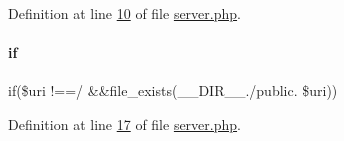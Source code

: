 Definition at line \mbox{\hyperlink{a00005_source_l00010}{10}} of file \mbox{\hyperlink{a00005_source}{server.\+php}}.

\mbox{\label{a00005_afc8b25b448fd1a3d79f6171af75f39ff_afc8b25b448fd1a3d79f6171af75f39ff}} 
\paragraph{\texorpdfstring{if}{if}}
{\footnotesize\ttfamily if(\$uri !==\textquotesingle{}/\textquotesingle{} \&\&file\+\_\+exists(\+\_\+\+\_\+\+D\+I\+R\+\_\+\+\_\+.\textquotesingle{}/public\textquotesingle{}. \$uri))}



Definition at line \mbox{\hyperlink{a00005_source_l00017}{17}} of file \mbox{\hyperlink{a00005_source}{server.\+php}}.

